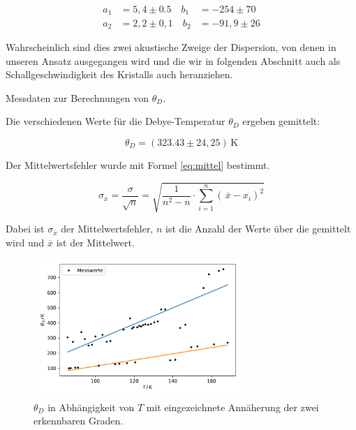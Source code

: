 \begin{align}
	a_1 &= 5,4 \pm 0.5 \quad b_1 &= -254 \pm 70\\
	a_2 &= 2,2 \pm 0,1 \quad b_2 &= -91,9 \pm 26
\end{align}

Wahrscheinlich sind dies zwei akustische Zweige der Dispersion, von denen in unseren Ansatz ausgegangen wird und die wir in folgenden Abschnitt auch als Schallgeschwindigkeit des Kristalls auch heranziehen.

\begin{table}
    \centering
    \caption{Messdaten zur Berechnungen von $\theta_D$.}
    \label{tab:Debye}
\end{table}

Die verschiedenen Werte für die Debye-Temperatur $\theta_D$ ergeben gemittelt:

\begin{equation*}
    \theta_D = (323.43 \pm 24,25) \, \mathrm{K}
    \label{eq:debye}
\end{equation*}

Der Mittelwertsfehler wurde mit Formel \eqref{eq:mittel} bestimmt.

\begin{equation}
    \sigma_{\overline{x}} = \frac{\sigma}{\sqrt{n}} = \sqrt{\frac{1}{n^2 - n} \cdot \sum\limits_{i=1}^{n} \left( \, \overline{x} - x_i \right)^2}
    \label{eq:mittel}
\end{equation}

Dabei ist $\sigma_{\overline{x}}$ der Mittelwertsfehler, $n$ ist die Anzahl der Werte über die gemittelt wird und $\overline{x}$ ist der Mittelwert.


\begin{figure}[H]
    \centering
    \includegraphics[width=0.7\textwidth]{build/Theta_T.pdf}
    \caption{$\theta_D$ in Abhängigkeit von $T$ mit eingezeichnete Annäherung der zwei erkennbaren Graden.}
    \label{fig:Theta_T}
\end{figure}

